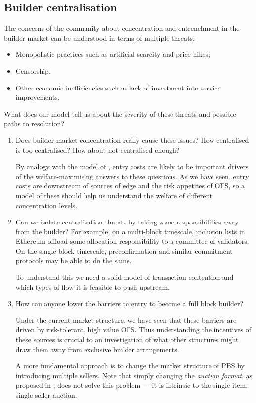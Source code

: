 \subsection*{Builder centralisation}

The concerns of the community about concentration and entrenchment in the builder market can be understood in terms of multiple threats:
%
\begin{itemize}
    \item Monopolistic practices such as artificial scarcity and price hikes;
    \item Censorship,
    \item Other economic inefficiencies such as lack of investment into service improvements.
\end{itemize}
%
What does our model tell us about the severity of these threats and possible paths to resolution?
%
\begin{enumerate}
  \item 
    Does builder market concentration really cause these issues?
    How centralised is too centralised? 
    How about not centralised enough?
    
    By analogy with the model of \cite{chitra2024analysis}, entry costs are likely to be important drivers of the welfare-maximising answers to these questions.
    As we have seen, entry costs are downstream of sources of edge and the risk appetites of OFS, so a model of these should help us understand the welfare of different concentration levels.

  \item
    Can we isolate centralisation threats by taking some responsibilities away from the builder?
    For example, on a multi-block timescale, inclusion lists in Ethereum offload some allocation responsibility to a committee of validators.
    On the single-block timescale, preconfirmation and similar commitment protocols may be able to do the same.
    
    To understand this we need a solid model of transaction contention and which types of flow it is feasible to push upstream.

  \item 
    How can anyone lower the barriers to entry to become a full block builder?
    
    Under the current market structure, we have seen that these barriers are driven by risk-tolerant, high value OFS.
    Thus understanding the incentives of these sources is crucial to an investigation of what other structures might draw them away from exclusive builder arrangements.
    
    A more fundamental approach is to change the market structure of PBS by introducing multiple sellers.
    Note that simply changing the \emph{auction format}, as proposed in \cite[\S6]{oz2024whoa}, does not solve this problem --- it is intrinsic to the single item, single seller auction.

\end{enumerate}

